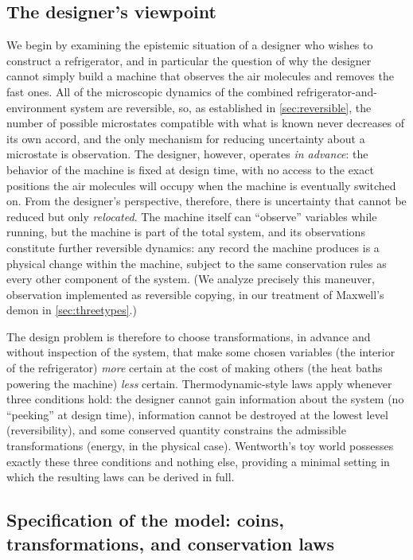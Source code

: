 \documentclass[11pt]{article}
\begin{document}
\subsection{The designer's viewpoint}
\label{sec:designer}

We begin by examining the epistemic situation of a designer who wishes to construct a refrigerator, and in particular the question of why the designer cannot simply build a machine that observes the air molecules and removes the fast ones. All of the microscopic dynamics of the combined refrigerator-and-environment system are reversible, so, as established in \cref{sec:reversible}, the number of possible microstates compatible with what is known never decreases of its own accord, and the only mechanism for reducing uncertainty about a microstate is observation. The designer, however, operates \emph{in advance}: the behavior of the machine is fixed at design time, with no access to the exact positions the air molecules will occupy when the machine is eventually switched on. From the designer's perspective, therefore, there is uncertainty that cannot be reduced but only \emph{relocated}. The machine itself can ``observe'' variables while running, but the machine is part of the total system, and its observations constitute further reversible dynamics: any record the machine produces is a physical change within the machine, subject to the same conservation rules as every other component of the system. (We analyze precisely this maneuver, observation implemented as reversible copying, in our treatment of Maxwell's demon in \cref{sec:threetypes}.)

The design problem is therefore to choose transformations, in advance and without inspection of the system, that make some chosen variables (the interior of the refrigerator) \emph{more} certain at the cost of making others (the heat baths powering the machine) \emph{less} certain. Thermodynamic-style laws apply whenever three conditions hold: the designer cannot gain information about the system (no ``peeking'' at design time), information cannot be destroyed at the lowest level (reversibility), and some conserved quantity constrains the admissible transformations (energy, in the physical case). Wentworth's toy world possesses exactly these three conditions and nothing else, providing a minimal setting in which the resulting laws can be derived in full.

\subsection{Specification of the model: coins, transformations, and conservation laws}
\label{sec:coinsetup}
\end{document}
